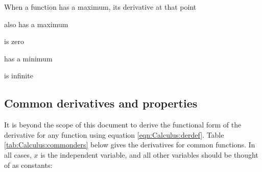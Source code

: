 
\begin{checkpoint}
\begin{MCquestion}{When a function has a maximum, its derivative at that point}
\item also has a maximum
\item is zero \correct
\item has a minimum
\item is infinite
\end{MCquestion}
\end{checkpoint}

\subsection{Common derivatives and properties}
It is beyond the scope of this document to derive the functional form of the derivative for any function using equation \ref{eqn:Calculus:derdef}. Table \ref{tab:Calculus:commonders} below gives the derivatives for common functions. In all cases, $x$ is the independent variable, and all other variables should be thought of as constants:

